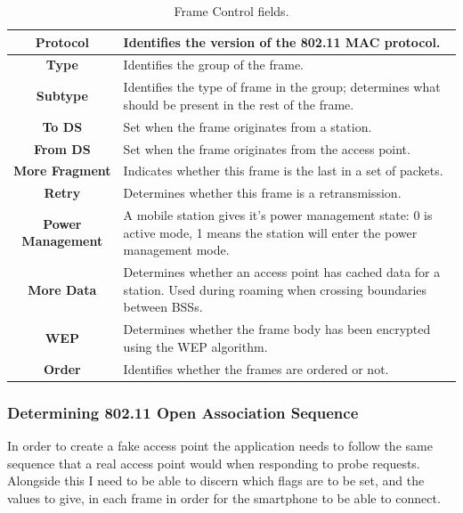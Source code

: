 \begin{table}[!h]
\begin{center}
	\begin{tabular}{ | c |  p{5cm} | }
 		\hline
		\textbf{Protocol} & Identifies the version of the 802.11 MAC protocol. \\ \hline
		\textbf{Type} & Identifies the group of the frame. \\ \hline
		\textbf{Subtype} & Identifies the type of frame in the group; determines what should be present in the rest of the frame. \\ \hline
		\textbf{To DS} & Set when the frame originates from a station. \\ \hline
		\textbf{From DS} & Set when the frame originates from the access point. \\ \hline
		\textbf{More Fragment} & Indicates whether this frame is the last in a set of packets. \\ \hline
		\textbf{Retry} & Determines whether this frame is a retransmission. \\ \hline
		\textbf{Power Management} & A mobile station gives it’s power management state: 0 is active mode, 1  means the station will enter the power management mode. \\ \hline
		\textbf{More Data} & Determines whether an access point has cached data for a station. Used during roaming when crossing boundaries between BSSs. \\ \hline
		\textbf{WEP} & Determines whether the frame body has been encrypted using the WEP \cite{research:wep} algorithm.  \\ \hline
		\textbf{Order} & Identifies whether the frames are ordered or not. \\ \hline
	\end{tabular}
		\caption{Frame Control fields.}
		\label{table:framecontrol}
\end{center}
\end{table}
\clearpage
\subsubsection*{Determining 802.11 Open Association Sequence}
In order to create a fake access point the application needs to follow the same sequence that a real access point would when responding to probe requests. Alongside this I need to be able to discern which flags are to be set, and the values to give, in each frame in order for the smartphone to be able to connect. 

